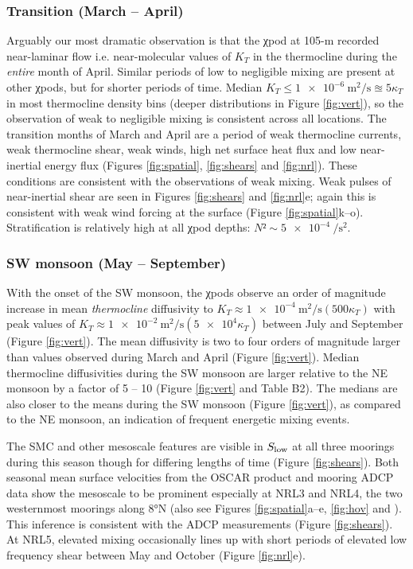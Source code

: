 \documentclass[onecol]{ametsoc}
\begin{document}
\subsubsection*{Transition (March -- April)}
\label{sec:org10f739a}

Arguably our most dramatic observation is that the χpod at 105-m recorded near-laminar flow i.e. near-molecular values of \(K_T\) in the thermocline during the \emph{entire} month of April.
Similar periods of low to negligible mixing are present at other χpods, but for shorter periods of time.
Median \(K_T ≤ \SI{1e-6}{\m\squared\per\s} \approxeq 5κ_T\) in most thermocline density bins (deeper distributions in Figure \ref{fig:vert}), so the observation of weak to negligible mixing is consistent across all locations.
The transition months of March and April are a period of weak thermocline currents, weak thermocline shear, weak winds, high net surface heat flux and low near-inertial energy flux (Figures \ref{fig:spatial}, \ref{fig:shears} and \ref{fig:nrl}). These conditions are consistent with the observations of weak mixing.
Weak pulses of near-inertial shear are seen in Figures \ref{fig:shears} and \ref{fig:nrl}e; again this is consistent with weak wind forcing at the surface (Figure \ref{fig:spatial}k--o).
Stratification is relatively high at all χpod depths: $N² \sim \SI{5e-4}{\per\second\squared}$.

\subsubsection*{SW monsoon (May -- September)}
\label{sec:orgec06087}

With the onset of the SW monsoon, the χpods observe an order of magnitude increase in mean \emph{thermocline} diffusivity to \(K_T \approx \SI{1e-4}{\m\squared\per\s} (500κ_T)\) with peak values of \(K_T \approx \SI{1e-2}{\m\squared\per\s} (\num{5e4}κ_T)\) between July and September (Figure \ref{fig:vert}).
The mean diffusivity is two to four orders of magnitude larger than values observed during March and April (Figure \ref{fig:vert}).
Median thermocline diffusivities during the SW monsoon are larger relative to the NE monsoon by a factor of 5 -- 10 (Figure \ref{fig:vert} and Table B2).
The medians are also closer to the means during the SW monsoon (Figure \ref{fig:vert}), as compared to the NE monsoon, an indication of frequent energetic mixing events.

The SMC and other mesoscale features are visible in \(S_\text{low}\) at all three moorings during this season though for differing lengths of time (Figure \ref{fig:shears}).
Both seasonal mean surface velocities from the OSCAR product and mooring ADCP data show the mesoscale to be prominent especially at NRL3 and NRL4, the two westernmost moorings along 8°N (also see Figures \ref{fig:spatial}a--e, \ref{fig:hov} and \citealp{Wijesekera2016a}).
This inference is consistent with the ADCP measurements (Figure \ref{fig:shears}). At NRL5, elevated mixing occasionally lines up with short periods of elevated low frequency shear between May and October (Figure \ref{fig:nrl}e).
\end{document}
